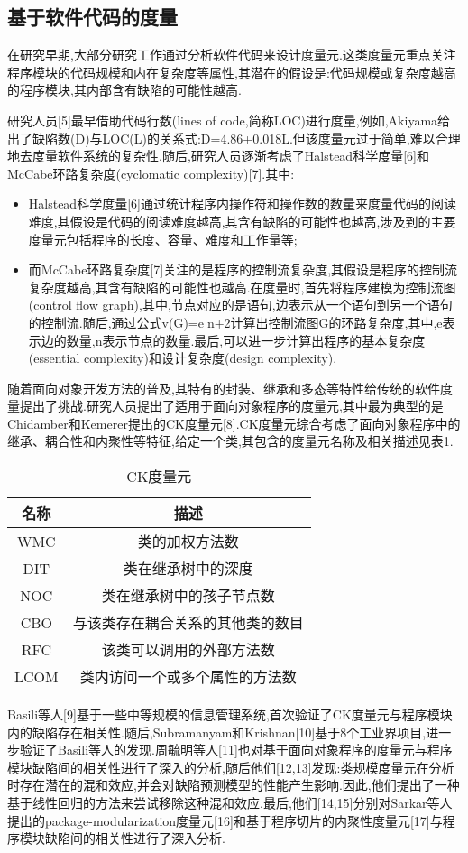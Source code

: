 \documentclass{rjthesis}
\begin{document}
	\subsection{基于软件代码的度量}
	
	在研究早期,大部分研究工作通过分析软件代码来设计度量元.这类度量元重点关注程序模块的代码规模和内在复杂度等属性,其潜在的假设是:代码规模或复杂度越高的程序模块,其内部含有缺陷的可能性越高.
	
	研究人员[5]最早借助代码行数(lines of code,简称LOC)进行度量,例如,Akiyama给出了缺陷数(D)与LOC(L)的关系式:D=4.86+0.018L.但该度量元过于简单,难以合理地去度量软件系统的复杂性.随后,研究人员逐渐考虑了Halstead科学度量[6]和McCabe环路复杂度(cyclomatic complexity)[7].其中:
	
	\begin{itemize}
		\item Halstead科学度量[6]通过统计程序内操作符和操作数的数量来度量代码的阅读难度,其假设是代码的阅读难度越高,其含有缺陷的可能性也越高,涉及到的主要度量元包括程序的长度、容量、难度和工作量等;
		\item 而McCabe环路复杂度[7]关注的是程序的控制流复杂度,其假设是程序的控制流复杂度越高,其含有缺陷的可能性也越高.在度量时,首先将程序建模为控制流图(control flow graph),其中,节点对应的是语句,边表示从一个语句到另一个语句的控制流.随后,通过公式v(G)=en+2计算出控制流图G的环路复杂度,其中,e表示边的数量,n表示节点的数量.最后,可以进一步计算出程序的基本复杂度(essential complexity)和设计复杂度(design complexity).
		
	\end{itemize}
	
	随着面向对象开发方法的普及,其特有的封装、继承和多态等特性给传统的软件度量提出了挑战.研究人员提出了适用于面向对象程序的度量元,其中最为典型的是Chidamber和Kemerer提出的CK度量元[8].CK度量元综合考虑了面向对象程序中的继承、耦合性和内聚性等特征,给定一个类,其包含的度量元名称及相关描述见表1.
	\begin{table}[h]
		\centering
		\caption{CK度量元}
		\begin{tabular}{cc}
			\toprule
			名称  & 描述\\
			\midrule
			WMC  & 类的加权方法数\\
			DIT  & 类在继承树中的深度\\
			NOC  & 类在继承树中的孩子节点数\\
			CBO  & 与该类存在耦合关系的其他类的数目\\
			RFC  & 该类可以调用的外部方法数\\
			LCOM & 类内访问一个或多个属性的方法数\\
			\bottomrule		
		\end{tabular}
	\end{table}
	
	Basili等人[9]基于一些中等规模的信息管理系统,首次验证了CK度量元与程序模块内的缺陷存在相关性.随后,Subramanyam和Krishnan[10]基于8个工业界项目,进一步验证了Basili等人的发现.周毓明等人[11]也对基于面向对象程序的度量元与程序模块缺陷间的相关性进行了深入的分析,随后他们[12,13]发现:类规模度量元在分析时存在潜在的混和效应,并会对缺陷预测模型的性能产生影响.因此,他们提出了一种基于线性回归的方法来尝试移除这种混和效应.最后,他们[14,15]分别对Sarkar等人提出的package-modularization度量元[16]和基于程序切片的内聚性度量元[17]与程序模块缺陷间的相关性进行了深入分析.
\end{document}
